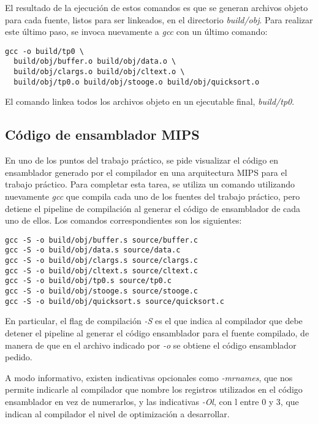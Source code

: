 \documentclass[a4paper,11pt]{article}
\begin{document}
El resultado de la ejecución de estos comandos es que se generan archivos
objeto para cada fuente, listos para ser linkeados, en el directorio
\textit{build/obj}. Para realizar este último paso, se invoca nuevamente a
\textit{gcc} con un último comando:

\begin{lstlisting}
gcc -o build/tp0 \
  build/obj/buffer.o build/obj/data.o \
  build/obj/clargs.o build/obj/cltext.o \
  build/obj/tp0.o build/obj/stooge.o build/obj/quicksort.o
\end{lstlisting}

El comando linkea todos los archivos objeto en un ejecutable final,
\textit{build/tp0}.

\subsection{Código de ensamblador MIPS}

En uno de los puntos del trabajo práctico, se pide visualizar el código en
ensamblador generado por el compilador en una arquitectura MIPS para el trabajo
práctico. Para completar esta tarea, se utiliza un comando utilizando
nuevamente \textit{gcc} que compila cada uno de los fuentes del trabajo
práctico, pero detiene el pipeline de compilación al generar el código de
ensamblador de cada uno de ellos. Los comandos correspondientes son los
siguientes:

\begin{lstlisting}
gcc -S -o build/obj/buffer.s source/buffer.c
gcc -S -o build/obj/data.s source/data.c
gcc -S -o build/obj/clargs.s source/clargs.c
gcc -S -o build/obj/cltext.s source/cltext.c
gcc -S -o build/obj/tp0.s source/tp0.c
gcc -S -o build/obj/stooge.s source/stooge.c
gcc -S -o build/obj/quicksort.s source/quicksort.c
\end{lstlisting}

En particular, el flag de compilación \textit{-S} es el que indica al
compilador que debe detener el pipeline al generar el código ensamblador para
el fuente compilado, de manera de que en el archivo indicado por \textit{-o} se
obtiene el código ensamblador pedido.

A modo informativo, existen indicativas opcionales como \textit{-mrnames}, que
nos permite indicarle al compilador que nombre los registros utilizados en el
código ensamblador en vez de numerarlos, y las indicativas \textit{-Ol}, con l
entre 0 y 3, que indican al compilador el nivel de optimización a desarrollar.
\end{document}

